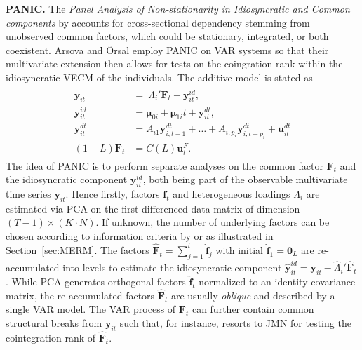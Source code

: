 \textbf{PANIC.} The \textit{Panel Analysis of Non‐stationarity in Idiosyncratic and Common components} by \cite{BaiNg2004} accounts for cross-sectional dependency stemming from unobserved common factors, which could be stationary, integrated, or both coexistent. Arsova and Örsal \citeyearpar{ArsovaOersal2017,ArsovaOersal2018} employ PANIC on VAR systems so that their multivariate extension then allows for tests on the coingration rank within the idiosyncratic VECM of the individuals. The additive model is stated as
\begin{align} \label{eq:PANIC}
\begin{split}
	\boldsymbol{y}_{it} \ & = \ \Lambda_i' \boldsymbol{F}_t + \boldsymbol{y}^{i \! d}_{it}, \\
	\boldsymbol{y}^{i \! d}_{it} \ & = \boldsymbol{\mu}_{0i} + \boldsymbol{\mu}_{1i}t + \boldsymbol{y}^{d \! t}_{it}, \\
	\boldsymbol{y}^{d \! t}_{it} \ & = A_{i1} \boldsymbol{y}^{d \! t}_{i,t-1} + \ldots + A_{i,p_i} \boldsymbol{y}^{d \! t}_{i,t-p_i} + \boldsymbol{u}^{d \! t}_{it} \\
	(1-L) \boldsymbol{F}_t & = C(L) \boldsymbol{u}^{F}_t.
\end{split}
\end{align}
The idea of PANIC is to perform separate analyses on the common factor $ \boldsymbol{F}_t $ and the idiosyncratic component $ \boldsymbol{y}^{i \! d}_{it} $, both being part of the observable multivariate time series $ \boldsymbol{y}_{it} $. Hence firstly, factors $ \boldsymbol{f}_t $ and heterogeneous loadings $ \Lambda_i $ are estimated via PCA on the first-differenced data matrix of dimension $ (T-1) \times (K \cdot N) $. If unknown, the number of underlying factors can be chosen according to information criteria by \citet{BaiNg2002} or \cite{Onatski2010} as illustrated in Section~\ref{sec:MERM}. The factors $ \boldsymbol{\hat{F}}_t = \sum_{j=1}^{t} \boldsymbol{\hat{f}}_j $ with initial $ \boldsymbol{\hat{f}}_1 = \boldsymbol{0}_L $ are re-accumulated into levels to estimate the idiosyncratic component $ \boldsymbol{\hat{y}}^{i \! d}_{it} = \boldsymbol{y}_{it} - \hat{\Lambda}_i' \boldsymbol{\hat{F}}_t $. While PCA generates orthogonal factors $ \boldsymbol{\hat{f}}_t $ normalized to an identity covariance matrix, the re-accumulated factors $ \boldsymbol{\hat{F}}_t $ are usually \textit{oblique} and described by a single VAR model. The VAR process of $ \boldsymbol{{F}}_t $ can further contain common structural breaks from $ \boldsymbol{y}_{it} $ such that, for instance, \citet{Oersal2017} resorts to JMN \citeyearpar{JohansenEtAl2000} for testing the cointegration rank of $ \boldsymbol{\hat{F}}_t $.

